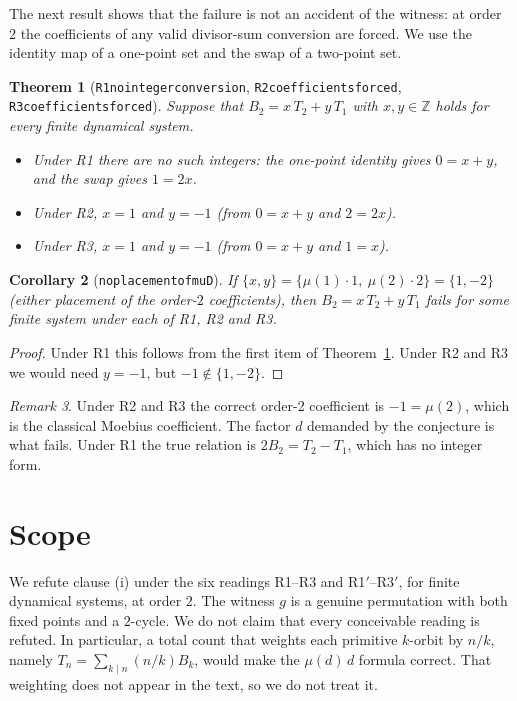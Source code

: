 \documentclass[11pt]{article}
\newtheorem{theorem}{Theorem}
\newtheorem{corollary}[theorem]{Corollary}
\theoremstyle{definition}
\theoremstyle{remark}
\newtheorem{remark}[theorem]{Remark}
\renewcommand{\_}{\oldus\allowbreak}
\begin{document}
The next result shows that the failure is not an accident of the witness: at order $2$ the coefficients of
any valid divisor-sum conversion are forced. We use the identity map of a one-point set and the swap of a
two-point set.

\begin{theorem}[\texttt{R1\_no\_integer\_conversion}, \texttt{R2\_coefficients\_forced},
\texttt{R3\_coefficients\_forced}]\label{thm:forced}
Suppose that $B_2=x\,T_2+y\,T_1$ with $x,y\in\mathbb Z$ holds for every finite dynamical system.
\begin{itemize}[nosep]
\item Under R1 there are no such integers: the one-point identity gives $0=x+y$, and the swap gives $1=2x$.
\item Under R2, $x=1$ and $y=-1$ (from $0=x+y$ and $2=2x$).
\item Under R3, $x=1$ and $y=-1$ (from $0=x+y$ and $1=x$).
\end{itemize}
\end{theorem}

\begin{corollary}[\texttt{no\_placement\_of\_muD}]
If $\{x,y\}=\{\mu(1)\cdot1,\ \mu(2)\cdot 2\}=\{1,-2\}$ (either placement of the order-$2$ coefficients),
then $B_2=x\,T_2+y\,T_1$ fails for some finite system under each of R1, R2 and R3.
\end{corollary}
\begin{proof}
Under R1 this follows from the first item of Theorem~\ref{thm:forced}. Under R2 and R3 we would need $y=-1$,
but $-1\notin\{1,-2\}$.
\end{proof}

\begin{remark}
Under R2 and R3 the correct order-2 coefficient is $-1=\mu(2)$, which is the classical Moebius
coefficient. The factor $d$ demanded by the conjecture is what fails. Under R1 the true relation is
$2B_2=T_2-T_1$, which has no integer form.
\end{remark}

\section{Scope}

We refute clause (i) under the six readings R1--R3 and R1$'$--R3$'$, for finite dynamical systems, at order
$2$. The witness $g$ is a genuine permutation with both fixed points and a $2$-cycle. We do not claim that
every conceivable reading is refuted. In particular, a total count that weights each primitive $k$-orbit by
$n/k$, namely $T_n=\sum_{k\mid n}(n/k)B_k$, would make the $\mu(d)\,d$ formula correct. That weighting does
not appear in the text, so we do not treat it.
\end{document}
